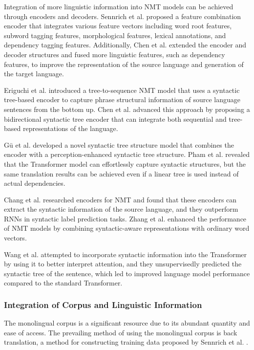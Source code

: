 \documentclass[acmsmall]{acmart}
\begin{document}
Integration of more linguistic information into NMT models can be achieved through encoders and decoders. Sennrich et al. \cite{n4-45} proposed a feature combination encoder that integrates various feature vectors including word root features, subword tagging features, morphological features, lexical annotations, and dependency tagging features. Additionally, Chen et al. \cite{n4-46} extended the encoder and decoder structures and fused more linguistic features, such as dependency features, to improve the representation of the source language and generation of the target language. 

Eriguchi et al. \cite{n4-47} introduced a tree-to-sequence NMT model that uses a syntactic tree-based encoder to capture phrase structural information of source language sentences from the bottom up. 
Chen et al. \cite{n4-48} advanced this approach by proposing a bidirectional syntactic tree encoder that can integrate both sequential and tree-based representations of the language. 

Gū et al. \cite{n4-49} developed a novel syntactic tree structure model that combines the encoder with a perception-enhanced syntactic tree structure. 
Pham et al. \cite{n4-50} revealed that the Transformer model can effortlessly capture syntactic structures, but the same translation results can be achieved even if a linear tree is used instead of actual dependencies. 

Chang et al. \cite{n4-51} researched encoders for NMT and found that these encoders can extract the syntactic information of the source language, and they outperform RNNs in syntactic label prediction tasks. 
Zhang et al. \cite{n4-52} enhanced the performance of NMT models by combining syntactic-aware representations with ordinary word vectors. 

Wang et al. \cite{n4-53} attempted to incorporate syntactic information into the Transformer by using it to better interpret attention, and they unsupervisedly predicted the syntactic tree of the sentence, which led to improved language model performance compared to the standard Transformer.

\subsubsection{Integration of Corpus and Linguistic Information}

The monolingual corpus is a significant resource due to its abundant quantity and ease of access. The prevailing method of using the monolingual corpus is back translation, a method for constructing training data proposed by Sennrich et al. \cite{3-5}.
\end{document}
